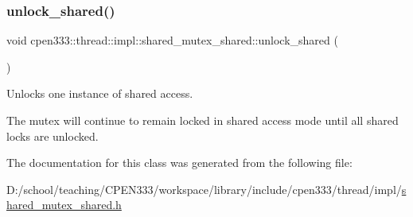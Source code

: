 \subsubsection{\texorpdfstring{unlock\+\_\+shared()}{unlock\_shared()}}
{\footnotesize\ttfamily void cpen333\+::thread\+::impl\+::shared\+\_\+mutex\+\_\+shared\+::unlock\+\_\+shared (\begin{DoxyParamCaption}{ }\end{DoxyParamCaption})\hspace{0.3cm}{\ttfamily [inline]}}



Unlocks one instance of shared access. 

The mutex will continue to remain locked in shared access mode until all shared locks are unlocked. 

The documentation for this class was generated from the following file\+:\begin{DoxyCompactItemize}
\item 
D\+:/school/teaching/\+C\+P\+E\+N333/workspace/library/include/cpen333/thread/impl/\hyperlink{thread_2impl_2shared__mutex__shared_8h}{shared\+\_\+mutex\+\_\+shared.\+h}\end{DoxyCompactItemize}

